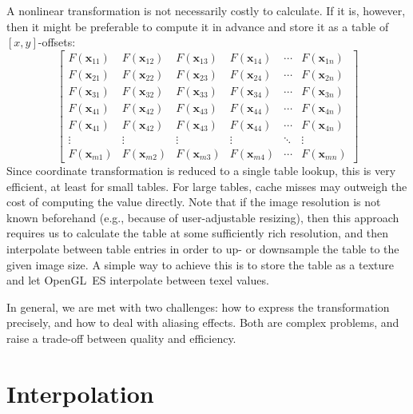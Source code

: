 \documentclass[english,12pt]{ifimaster}
\begin{document}
A nonlinear transformation is not necessarily costly to calculate. If
it is, however, then it might be preferable to compute it in advance
and store it as a table of $[x, y]$-offsets:
\begin{displaymath}
  \left[
    \begin{matrix}
      F(\mathbf{x}_{11}) & F(\mathbf{x}_{12}) & F(\mathbf{x}_{13}) & F(\mathbf{x}_{14}) & \dotsb & F(\mathbf{x}_{1n}) \\
      F(\mathbf{x}_{21}) & F(\mathbf{x}_{22}) & F(\mathbf{x}_{23}) & F(\mathbf{x}_{24}) & \dotsb & F(\mathbf{x}_{2n}) \\
      F(\mathbf{x}_{31}) & F(\mathbf{x}_{32}) & F(\mathbf{x}_{33}) & F(\mathbf{x}_{34}) & \dotsb & F(\mathbf{x}_{3n}) \\
      F(\mathbf{x}_{41}) & F(\mathbf{x}_{42}) & F(\mathbf{x}_{43}) & F(\mathbf{x}_{44}) & \dotsb & F(\mathbf{x}_{4n}) \\
      F(\mathbf{x}_{41}) & F(\mathbf{x}_{42}) & F(\mathbf{x}_{43}) & F(\mathbf{x}_{44}) & \dotsb & F(\mathbf{x}_{4n}) \\
      \vdots             & \vdots             & \vdots             & \vdots             & \ddots & \vdots             \\
      F(\mathbf{x}_{m1}) & F(\mathbf{x}_{m2}) & F(\mathbf{x}_{m3}) & F(\mathbf{x}_{m4}) & \dotsb & F(\mathbf{x}_{mn})
    \end{matrix}
  \right]
\end{displaymath}
Since coordinate transformation is reduced to a single table lookup,
this is very efficient, at least for small tables. For large tables,
cache misses may outweigh the cost of computing the value directly.
Note that if the image resolution is not known beforehand (e.g.,
because of user-adjustable resizing), then this approach requires us
to calculate the table at some sufficiently rich resolution, and then
interpolate between table entries in order to up- or downsample the
table to the given image size. A simple way to achieve this is to
store the table as a texture and let OpenGL~ES interpolate between
texel values.

In general, we are met with two challenges: how to express the
transformation precisely, and how to deal with aliasing effects. Both
are complex problems, and raise a trade-off between quality and
efficiency.

\section{Interpolation}
\label{sec:interpolation}
\end{document}
